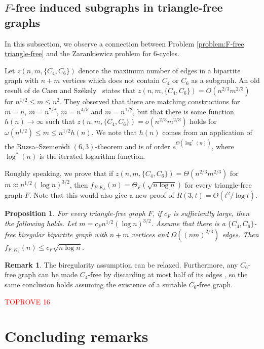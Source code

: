 \documentclass[11pt]{article}
\let\oldendproof\endproof
\renewenvironment{proof}[1][\proofname]{\oldproof[\bf #1]}{\oldendproof}
\theoremstyle{plain}
\newtheorem{proposition}[theorem]{Proposition}
\theoremstyle{definition}
\newtheorem{remark}[theorem]{Remark}
\begin{document}
\subsection{$F$-free induced subgraphs in triangle-free graphs} \label{sec:F vs triangle}

In this subsection, we observe a connection between Problem \ref{problem:F-free triangle-free} and the Zarankiewicz problem for $6$-cycles.

Let $z(n,m,\{C_4,C_6\})$ denote the maximum number of edges in a bipartite graph with $n+m$ vertices which does not contain $C_4$ or $C_6$ as a subgraph. An old result of de Caen and Sz\'ekely~\cite{DSz97} states that $z(n,m,\{C_4,C_6\})=O(n^{2/3}m^{2/3})$ for $n^{1/2}\leq m\leq n^2$. They observed that there are matching constructions for $m=n$, $m=n^{7/8}$, $m=n^{4/5}$ and $m=n^{1/2}$, but that there is some function $h(n)\rightarrow \infty$ such that $z(n,m,\{C_4,C_6\})=o(n^{2/3}m^{2/3})$ holds for $\omega(n^{1/2})\leq m\leq n^{1/2}h(n)$. We note that $h(n)$ comes from an application of the Ruzsa--Szemer\'edi $(6,3)$-theorem \cite{RSz78} and is of order $e^{\Theta(\log^*(n))}$, where $\log^*(n)$ is the iterated logarithm function.

Roughly speaking, we prove that if $z(n,m,\{C_4,C_6\})=\Theta(n^{2/3}m^{2/3})$ for $m\approx n^{1/2}(\log n)^{3/2}$, then $f_{F,K_3}(n)=\Theta_F(\sqrt{n \log n})$ for every triangle-free graph $F$. Note that this would also give a new proof of $R(3,t)=\Theta(t^2/\log t)$.

\begin{proposition}
	For every triangle-free graph $F$, if $c_F$ is sufficiently large, then the following holds. Let $m=c_F n^{1/2}(\log n)^{3/2}$. Assume that there is a $\{C_4,C_6\}$-free biregular bipartite graph with $n+m$ vertices and $\Omega((nm)^{2/3})$ edges. Then $f_{F,K_3}(n)\leq c_F\sqrt{n \log n}$.
\end{proposition}

\begin{remark}
	The biregularity assumption can be relaxed. Furthermore, any $C_6$-free graph can be made $C_4$-free by discarding at most half of its edges \cite{Gyori97}, so the same conclusion holds assuming the existence of a suitable $C_6$-free graph.
\end{remark}

\begin{proof}\textcolor{red}{TOPROVE 16}\end{proof}

\section{Concluding remarks} \label{sec:concluding}
\end{document}
